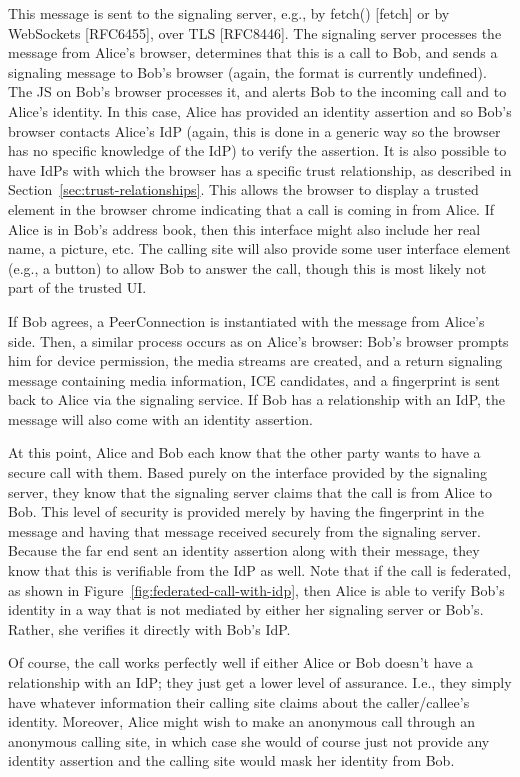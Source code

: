 \documentclass{article}
\begin{document}
This message is sent to the signaling server, e.g., by fetch()
[fetch] or by WebSockets [RFC6455], over TLS [RFC8446].  The
signaling server processes the message from Alice's browser,
determines that this is a call to Bob, and sends a signaling message
to Bob's browser (again, the format is currently undefined).  The JS
on Bob's browser processes it, and alerts Bob to the incoming call
and to Alice's identity.  In this case, Alice has provided an
identity assertion and so Bob's browser contacts Alice's IdP (again,
this is done in a generic way so the browser has no specific
knowledge of the IdP) to verify the assertion.  It is also possible
to have IdPs with which the browser has a specific trust
relationship, as described in Section~\ref{sec:trust-relationships}.  This allows the browser
to display a trusted element in the browser chrome indicating that a
call is coming in from Alice.  If Alice is in Bob's address book,
then this interface might also include her real name, a picture, etc.
The calling site will also provide some user interface element (e.g.,
a button) to allow Bob to answer the call, though this is most likely
not part of the trusted UI.

If Bob agrees, a PeerConnection is instantiated with the message from
Alice's side.  Then, a similar process occurs as on Alice's browser:
Bob's browser prompts him for device permission, the media streams
are created, and a return signaling message containing media
information, ICE candidates, and a fingerprint is sent back to Alice
via the signaling service.  If Bob has a relationship with an IdP,
the message will also come with an identity assertion.

At this point, Alice and Bob each know that the other party wants to
have a secure call with them.  Based purely on the interface provided
by the signaling server, they know that the signaling server claims
that the call is from Alice to Bob. This level of security is
provided merely by having the fingerprint in the message and having
that message received securely from the signaling server.  Because
the far end sent an identity assertion along with their message, they
know that this is verifiable from the IdP as well.  Note that if the
call is federated, as shown in Figure~\ref{fig:federated-call-with-idp}, then Alice is able to verify
Bob's identity in a way that is not mediated by either her signaling
server or Bob's.  Rather, she verifies it directly with Bob's IdP.

Of course, the call works perfectly well if either Alice or Bob
doesn't have a relationship with an IdP; they just get a lower level
of assurance.  I.e., they simply have whatever information their
calling site claims about the caller/callee's identity.  Moreover,
Alice might wish to make an anonymous call through an anonymous
calling site, in which case she would of course just not provide any
identity assertion and the calling site would mask her identity from
Bob.
\end{document}
